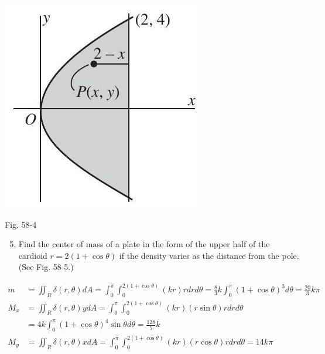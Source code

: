 \documentclass[10pt]{article}
\begin{document}
\begin{center}
\includegraphics[max width=\textwidth]{2024_04_20_fe2e8e718cc0fcd63d1bg-14}
\end{center}

Fig. 58-4

\begin{enumerate}
  \setcounter{enumi}{4}
  \item Find the center of mass of a plate in the form of the upper half of the cardioid $r=2(1+\cos \theta)$ if the density varies as the distance from the pole. (See Fig. 58-5.)
\end{enumerate}

$$
\begin{aligned}
m & =\iint_{R} \delta(r, \theta) d A=\int_{0}^{\pi} \int_{0}^{2(1+\cos \theta)}(k r) r d r d \theta=\frac{8}{3} k \int_{0}^{\pi}(1+\cos \theta)^{3} d \theta=\frac{20}{3} k \pi \\
M_{x} & =\iint_{R} \delta(r, \theta) y d A=\int_{0}^{\pi} \int_{0}^{2(1+\cos \theta)}(k r)(r \sin \theta) r d r d \theta \\
& =4 k \int_{0}^{\pi}(1+\cos \theta)^{4} \sin \theta d \theta=\frac{128}{5} k \\
M_{y} & =\iint_{R} \delta(r, \theta) x d A=\int_{0}^{\pi} \int_{0}^{2(1+\cos \theta)}(k r)(r \cos \theta) r d r d \theta=14 k \pi
\end{aligned}
$$
\end{document}

